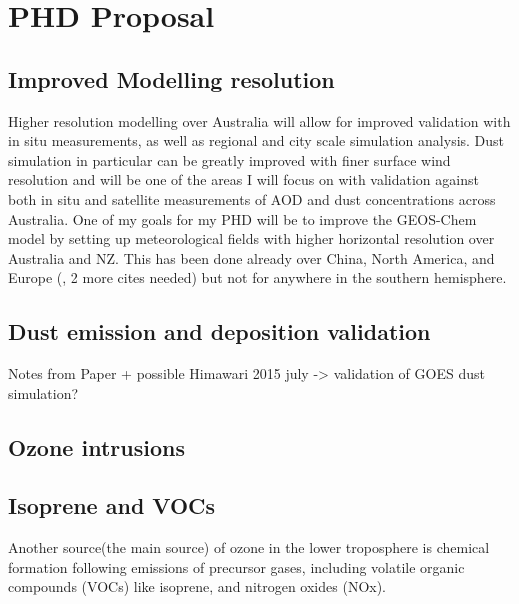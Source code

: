 \section{PHD Proposal}

\subsection{Improved Modelling resolution}
Higher resolution modelling over Australia will allow for improved validation with in situ measurements, as well as regional and city scale simulation analysis. 
Dust simulation in particular can be greatly improved with finer surface wind resolution and will be one of the areas I will focus on with validation against both in situ and satellite measurements of AOD and dust concentrations across Australia.
One of my goals for my PHD will be to improve the GEOS-Chem model by setting up meteorological fields with higher horizontal resolution over Australia and NZ.
This has been done already over China, North America, and Europe (\cite{Chen_2009}, 2 more cites needed) but not for anywhere in the southern hemisphere.

\subsection{Dust emission and deposition validation}
Notes from Paper + possible Himawari 2015 july -> validation of GOES dust simulation?

\subsection{Ozone intrusions}

\subsection{Isoprene and VOCs}
Another source(the main source) of ozone in the lower troposphere is chemical formation following emissions of precursor gases, including volatile organic compounds (VOCs) like isoprene, and nitrogen oxides (NOx).

  

  